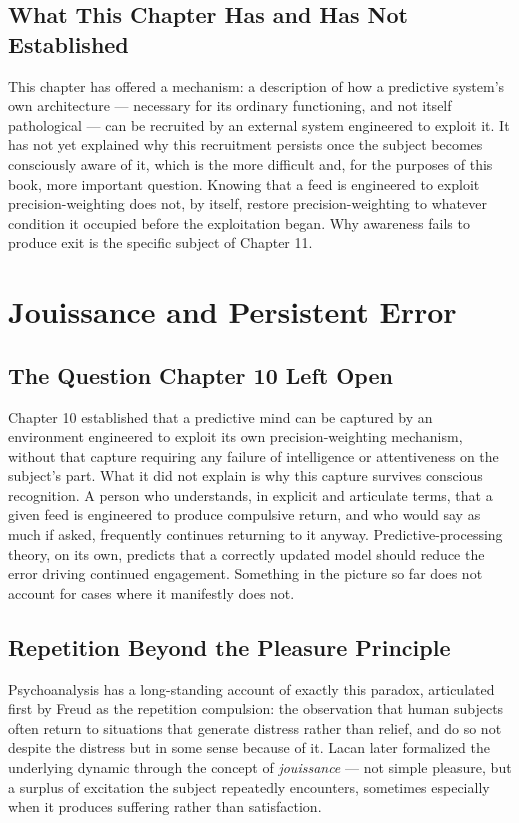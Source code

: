 \documentclass[12pt,a4paper]{book}
\begin{document}
\section{What This Chapter Has and Has Not Established}

This chapter has offered a mechanism: a description of how a predictive system's own architecture — necessary for its ordinary functioning, and not itself pathological — can be recruited by an external system engineered to exploit it. It has not yet explained why this recruitment persists once the subject becomes consciously aware of it, which is the more difficult and, for the purposes of this book, more important question. Knowing that a feed is engineered to exploit precision-weighting does not, by itself, restore precision-weighting to whatever condition it occupied before the exploitation began. Why awareness fails to produce exit is the specific subject of Chapter 11.


\chapter{Jouissance and Persistent Error}

\section{The Question Chapter 10 Left Open}

Chapter 10 established that a predictive mind can be captured by an environment engineered to exploit its own precision-weighting mechanism, without that capture requiring any failure of intelligence or attentiveness on the subject's part. What it did not explain is why this capture survives conscious recognition. A person who understands, in explicit and articulate terms, that a given feed is engineered to produce compulsive return, and who would say as much if asked, frequently continues returning to it anyway. Predictive-processing theory, on its own, predicts that a correctly updated model should reduce the error driving continued engagement. Something in the picture so far does not account for cases where it manifestly does not.

\section{Repetition Beyond the Pleasure Principle}

Psychoanalysis has a long-standing account of exactly this paradox, articulated first by Freud as the repetition compulsion: the observation that human subjects often return to situations that generate distress rather than relief, and do so not despite the distress but in some sense because of it. Lacan later formalized the underlying dynamic through the concept of \emph{jouissance} — not simple pleasure, but a surplus of excitation the subject repeatedly encounters, sometimes especially when it produces suffering rather than satisfaction.
\end{document}
